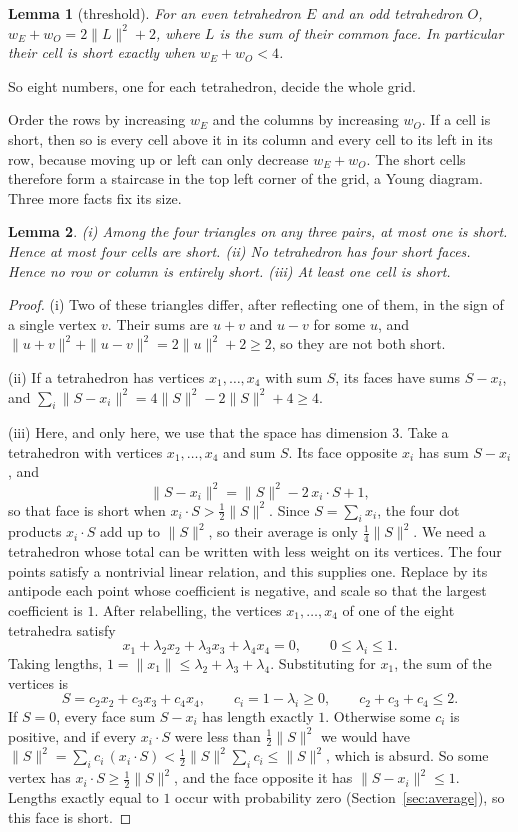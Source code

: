 \documentclass[11pt,a4paper]{article}
\newtheorem{lemma}{Lemma}
\begin{document}
\begin{lemma}[threshold]\label{lem:threshold}
For an even tetrahedron $E$ and an odd tetrahedron $O$,
$w_E+w_O=2\|L\|^2+2$, where $L$ is the sum of their common face. In
particular their cell is short exactly when $w_E+w_O<4$.
\end{lemma}

So eight numbers, one for each tetrahedron, decide the whole grid.

Order the rows by increasing $w_E$ and the columns by increasing $w_O$.
If a cell is short, then so is every cell above it in its column and every
cell to its left in its row, because moving up or left can only decrease
$w_E+w_O$. The short cells therefore form a staircase in the top left corner
of the grid, a Young diagram. Three more facts fix its size.

\begin{lemma}\label{lem:restrict}
\textup{(i)} Among the four triangles on any three pairs, at most one is
short. Hence at most four cells are short.
\textup{(ii)} No tetrahedron has four short faces. Hence no row or column is
entirely short.
\textup{(iii)} At least one cell is short.
\end{lemma}

\begin{proof}
(i) Two of these triangles differ, after reflecting one of them, in the
sign of a single vertex $v$. Their sums are $u+v$ and $u-v$ for some $u$,
and $\|u+v\|^2+\|u-v\|^2=2\|u\|^2+2\ge2$, so they are not both short.

(ii) If a tetrahedron has vertices $x_1,\dots,x_4$ with sum $S$, its faces
have sums $S-x_i$, and
$\sum_i\|S-x_i\|^2=4\|S\|^2-2\|S\|^2+4\ge4$.

(iii) Here, and only here, we use that the space has dimension $3$. Take
a tetrahedron with vertices $x_1,\dots,x_4$ and sum $S$. Its face opposite
$x_i$ has sum $S-x_i$, and
\[
 \|S-x_i\|^2=\|S\|^2-2\,x_i\cdot S+1,
\]
so that face is short when $x_i\cdot S>\frac12\|S\|^2$. Since
$S=\sum_ix_i$, the four dot products $x_i\cdot S$ add up to $\|S\|^2$, so
their average is only $\frac14\|S\|^2$. We need a tetrahedron whose total
can be written with less weight on its vertices. The four points satisfy a
nontrivial linear relation, and this supplies one. Replace by its antipode
each point whose coefficient is negative, and scale so that the largest
coefficient is $1$. After relabelling, the vertices $x_1,\dots,x_4$ of one
of the eight tetrahedra satisfy
\[
 x_1+\lambda_2x_2+\lambda_3x_3+\lambda_4x_4=0,
 \qquad 0\le\lambda_i\le1 .
\]
Taking lengths, $1=\|x_1\|\le\lambda_2+\lambda_3+\lambda_4$. Substituting
for $x_1$, the sum of the vertices is
\[
 S=c_2x_2+c_3x_3+c_4x_4,\qquad c_i=1-\lambda_i\ge0,\qquad
 c_2+c_3+c_4\le2 .
\]
If $S=0$, every face sum $S-x_i$ has length exactly $1$. Otherwise some
$c_i$ is positive, and if every $x_i\cdot S$ were less than
$\frac12\|S\|^2$ we would have
$\|S\|^2=\sum_ic_i\,(x_i\cdot S)<\frac12\|S\|^2\sum_ic_i\le\|S\|^2$, which
is absurd. So some vertex has $x_i\cdot S\ge\frac12\|S\|^2$, and the face
opposite it has $\|S-x_i\|^2\le1$. Lengths exactly equal to $1$
occur with probability zero (Section~\ref{sec:average}), so this face is
short.
\end{proof}
\end{document}
